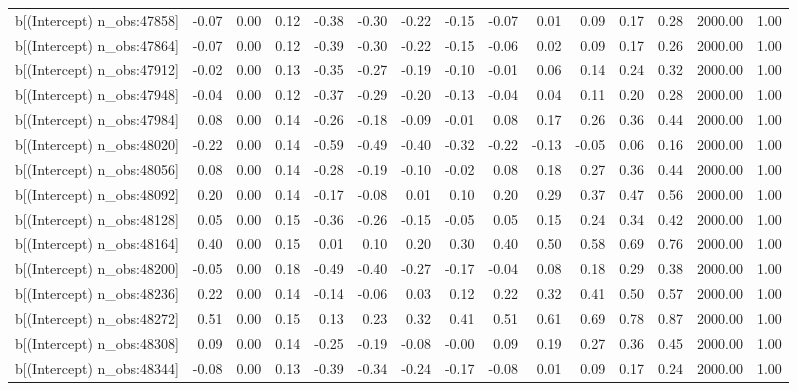 \begin{table}[ht]
\begin{tabular}{rrrrrrrrrrrrrrr}
  b[(Intercept) n\_obs:47858] & -0.07 & 0.00 & 0.12 & -0.38 & -0.30 & -0.22 & -0.15 & -0.07 & 0.01 & 0.09 & 0.17 & 0.28 & 2000.00 & 1.00 \\ 
  b[(Intercept) n\_obs:47864] & -0.07 & 0.00 & 0.12 & -0.39 & -0.30 & -0.22 & -0.15 & -0.06 & 0.02 & 0.09 & 0.17 & 0.26 & 2000.00 & 1.00 \\ 
  b[(Intercept) n\_obs:47912] & -0.02 & 0.00 & 0.13 & -0.35 & -0.27 & -0.19 & -0.10 & -0.01 & 0.06 & 0.14 & 0.24 & 0.32 & 2000.00 & 1.00 \\ 
  b[(Intercept) n\_obs:47948] & -0.04 & 0.00 & 0.12 & -0.37 & -0.29 & -0.20 & -0.13 & -0.04 & 0.04 & 0.11 & 0.20 & 0.28 & 2000.00 & 1.00 \\ 
  b[(Intercept) n\_obs:47984] & 0.08 & 0.00 & 0.14 & -0.26 & -0.18 & -0.09 & -0.01 & 0.08 & 0.17 & 0.26 & 0.36 & 0.44 & 2000.00 & 1.00 \\ 
  b[(Intercept) n\_obs:48020] & -0.22 & 0.00 & 0.14 & -0.59 & -0.49 & -0.40 & -0.32 & -0.22 & -0.13 & -0.05 & 0.06 & 0.16 & 2000.00 & 1.00 \\ 
  b[(Intercept) n\_obs:48056] & 0.08 & 0.00 & 0.14 & -0.28 & -0.19 & -0.10 & -0.02 & 0.08 & 0.18 & 0.27 & 0.36 & 0.44 & 2000.00 & 1.00 \\ 
  b[(Intercept) n\_obs:48092] & 0.20 & 0.00 & 0.14 & -0.17 & -0.08 & 0.01 & 0.10 & 0.20 & 0.29 & 0.37 & 0.47 & 0.56 & 2000.00 & 1.00 \\ 
  b[(Intercept) n\_obs:48128] & 0.05 & 0.00 & 0.15 & -0.36 & -0.26 & -0.15 & -0.05 & 0.05 & 0.15 & 0.24 & 0.34 & 0.42 & 2000.00 & 1.00 \\ 
  b[(Intercept) n\_obs:48164] & 0.40 & 0.00 & 0.15 & 0.01 & 0.10 & 0.20 & 0.30 & 0.40 & 0.50 & 0.58 & 0.69 & 0.76 & 2000.00 & 1.00 \\ 
  b[(Intercept) n\_obs:48200] & -0.05 & 0.00 & 0.18 & -0.49 & -0.40 & -0.27 & -0.17 & -0.04 & 0.08 & 0.18 & 0.29 & 0.38 & 2000.00 & 1.00 \\ 
  b[(Intercept) n\_obs:48236] & 0.22 & 0.00 & 0.14 & -0.14 & -0.06 & 0.03 & 0.12 & 0.22 & 0.32 & 0.41 & 0.50 & 0.57 & 2000.00 & 1.00 \\ 
  b[(Intercept) n\_obs:48272] & 0.51 & 0.00 & 0.15 & 0.13 & 0.23 & 0.32 & 0.41 & 0.51 & 0.61 & 0.69 & 0.78 & 0.87 & 2000.00 & 1.00 \\ 
  b[(Intercept) n\_obs:48308] & 0.09 & 0.00 & 0.14 & -0.25 & -0.19 & -0.08 & -0.00 & 0.09 & 0.19 & 0.27 & 0.36 & 0.45 & 2000.00 & 1.00 \\ 
  b[(Intercept) n\_obs:48344] & -0.08 & 0.00 & 0.13 & -0.39 & -0.34 & -0.24 & -0.17 & -0.08 & 0.01 & 0.09 & 0.17 & 0.24 & 2000.00 & 1.00 \\ 

\end{tabular}
\end{table}
